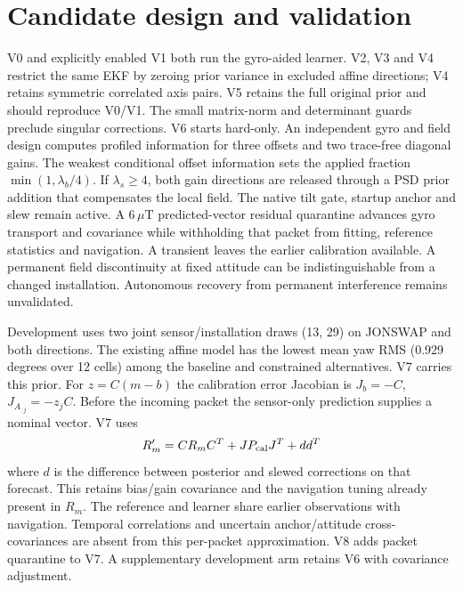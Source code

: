 \documentclass[conference]{IEEEtran}
\newcommand{\uT}{\,\mu\mathrm T}
\begin{document}
\section{Candidate design and validation}
V0 and explicitly enabled V1 both run the gyro-aided learner. V2, V3 and V4 restrict the same EKF by zeroing prior variance in excluded affine directions; V4 retains symmetric correlated axis pairs. V5 retains the full original prior and should reproduce V0/V1. The small matrix-norm and determinant guards preclude singular corrections. V6 starts hard-only. An independent gyro and field design computes profiled information for three offsets and two trace-free diagonal gains. The weakest conditional offset information sets the applied fraction $\min(1,\lambda_b/4)$. If $\lambda_s\ge4$, both gain directions are released through a PSD prior addition that compensates the local field. The native tilt gate, startup anchor and slew remain active. A $6\uT$ predicted-vector residual quarantine advances gyro transport and covariance while withholding that packet from fitting, reference statistics and navigation. A transient leaves the earlier calibration available. A permanent field discontinuity at fixed attitude can be indistinguishable from a changed installation. Autonomous recovery from permanent interference remains unvalidated.

Development uses two joint sensor/installation draws (13, 29) on JONSWAP and both directions. The existing affine model has the lowest mean yaw RMS (0.929 degrees over 12 cells) among the baseline and constrained alternatives. V7 carries this prior. For $z=C(m-b)$ the calibration error Jacobian is $J_b=-C$, $J_{A_{:j}}=-z_j C$. Before the incoming packet the sensor-only prediction supplies a nominal vector. V7 uses
\[
 R'_m=C R_m C^T+J P_{\rm cal}J^T+dd^T
\]
where $d$ is the difference between posterior and slewed corrections on that forecast. This retains bias/gain covariance and the navigation tuning already present in $R_m$. The reference and learner share earlier observations with navigation. Temporal correlations and uncertain anchor/attitude cross-covariances are absent from this per-packet approximation. V8 adds packet quarantine to V7. A supplementary development arm retains V6 with covariance adjustment.
\end{document}
